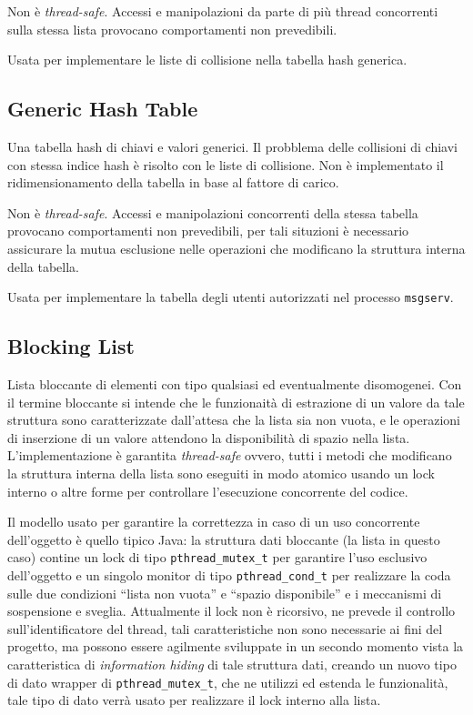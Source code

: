 \documentclass[a4paper,10pt]{article}
\begin{document}
Non \`e \emph{thread-safe}. Accessi e manipolazioni da parte di pi\`u
thread concorrenti sulla stessa lista provocano comportamenti non
prevedibili.

Usata per implementare le liste di collisione nella tabella hash
generica.

\subsection{Generic Hash Table}
Una tabella hash di chiavi e valori generici. Il probblema delle
collisioni di chiavi con stessa indice hash \`e risolto con le liste
di collisione. Non \`e implementato il ridimensionamento della tabella
in base al fattore di carico.

Non \`e \emph{thread-safe}. Accessi e manipolazioni concorrenti della
stessa tabella provocano comportamenti non prevedibili, per tali
situzioni \`e necessario assicurare la mutua esclusione nelle
operazioni che modificano la struttura interna della tabella.

Usata per implementare la tabella degli utenti autorizzati nel
processo \texttt{msgs\-erv}.

\subsection{Blocking List}
Lista bloccante di elementi con tipo qualsiasi ed eventualmente
disomogenei. Con il termine bloccante si intende che le funzionait\`a
di estrazione di un valore da tale struttura sono caratterizzate
dall'attesa che la lista sia non vuota, e le operazioni di inserzione
di un valore attendono la disponibilit\`a di spazio nella
lista. L'implementazione \`e garantita \emph{thread-safe} ovvero,
tutti i metodi che modificano la struttura interna della lista sono
eseguiti in modo atomico usando un lock interno o altre forme per
controllare l'esecuzione concorrente del codice.

Il modello usato per garantire la correttezza in caso di un uso
concorrente dell'oggetto \`e quello tipico Java: la struttura dati
bloccante (la lista in questo caso) contine un lock di tipo
\texttt{pthread\_mutex\_t} per garantire l'uso esclusivo dell'oggetto
e un singolo monitor di tipo \texttt{pthread\_cond\_t} per realizzare
la coda sulle due condizioni ``lista non vuota'' e ``spazio
disponibile'' e i meccanismi di sospensione e sveglia. Attualmente il
lock non \`e ricorsivo, ne prevede il controllo sull'identificatore
del thread, tali caratteristiche non sono necessarie ai fini del
progetto, ma possono essere agilmente sviluppate in un secondo momento
vista la caratteristica di \emph{information hiding} di tale struttura
dati, creando un nuovo tipo di dato wrapper di
\texttt{pthread\_mutex\_t}, che ne utilizzi ed estenda le
funzionalit\`a, tale tipo di dato verr\`a usato per realizzare il lock
interno alla lista.
\end{document}
